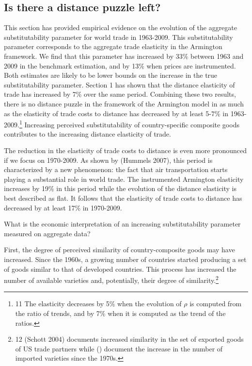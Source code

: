 \documentclass[12pt,twoside,a4paper,notitlepage]{article}
\begin{document}
{\subsection{ Is there a distance puzzle left? \label{mark-2.4.}}

This section has provided empirical evidence on the evolution of the aggregate substitutability parameter for world trade in 1963-2009.
This substitutability parameter corresponds to the aggregate trade elasticity in the Armington framework.
We find that this parameter has increased by 33\% between 1963 and 2009 in the benchmark estimation, and by 13\% when prices are instrumented.
Both estimates are likely to be lower bounds on the increase in the true substitutability parameter.
Section 1 has shown that the distance elasticity of trade has increased by 7\% over the same period.
Combining these two results, there is no distance puzzle in the framework of the Armington model in as much as the elasticity of trade costs to distance has decreased by at least 5-7\% in 1963-2009.\footnote{11 The elasticity decreases by 5\% when the evolution of $\rho$ is computed from the ratio of trends, and by 7\% when it is computed as the trend of the ratios.
} Increasing perceived substitutability of country-specific composite goods contributes to the increasing distance elasticity of trade.

The reduction in the elasticity of trade costs to distance is even more pronounced if we focus on 1970-2009.
As shown by (Hummels 2007), this period is characterized by a new phenomenon: the fact that air transportation starts playing a substantial role in world trade.
The instrumented Armington elasticity increases by 19\% in this period while the evolution of the distance elasticity is best described as flat.
It follows that the elasticity of trade costs to distance has decreased by at least 17\% in 1970-2009.


What is the economic interpretation of an increasing substitutability parameter measured on aggregate data? 

First, the degree of perceived similarity of country-composite goods may have increased.
Since the 1960s, a growing number of countries started producing a set of goods similar to that of developed countries.
This process has increased the number of available varieties and, potentially, their degree of similarity.\footnote{12 (Schott 2004) documents increased similarity in the set of exported goods of US trade partners while (\cite{Broda2006}) document the increase in the number of imported varieties since the 1970s.
} 

}
\end{document}
